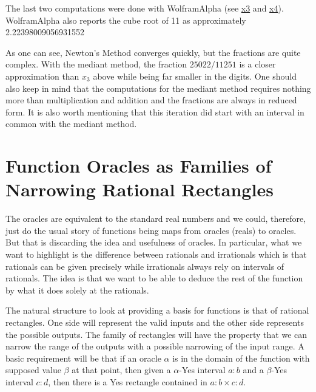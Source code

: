 \documentclass[12pt]{article}
\theoremstyle{remark}
\begin{document}
The last two computations  were done with WolframAlpha (see 
\href{https://www.wolframalpha.com/input?key=&i2d=true&i=%5C%2840%29Divide%5B2162%2C972%5D%5C%2841%29+-+Divide%5B%5C%2840%29+Power%5B%5C%2840%29Divide%5B2162%2C972%5D%5C%2841%29%2C3%5D-+11%5C%2841%29%2C3*Power%5B%5C%2840%29Divide%5B2162%2C972%5D%5C%2841%29%2C2%5D%5D}{x3} and 
\href{https://www.wolframalpha.com/input?key=&i2d=true&i=%5C%2840%29Divide%5B1894566349%2C851880969%5D%5C%2841%29+-++Divide%5B%5C%2840%29+Power%5B%5C%2840%29Divide%5B1894566349%2C851880969%5D%5C%2841%29%2C3%5D-11%5C%2841%29%2C%5C%2840%293+Power%5B%5C%2840%29Divide%5B1894566349%2C851880969%5D%5C%2841%29%2C2%5D%5C%2841%29%5D}{x4}).  WolframAlpha also reports the cube root of 11 as approximately 2.22398009056931552 

As one can see, Newton's Method converges quickly, but the fractions are quite complex. With the mediant method, the fraction $25022/11251$ is a closer approximation than $x_3$ above while being far smaller in the digits. One should also keep in mind that the computations for the mediant method requires nothing more than multiplication and addition and the fractions are always in reduced form. It is also worth mentioning that this iteration did start with an interval in common with the mediant method. 


\section{Function Oracles as Families of Narrowing Rational Rectangles}

The oracles are equivalent to the standard real numbers and we could, therefore, just do the usual story of functions being maps from oracles (reals) to oracles. But that is discarding the idea and usefulness of oracles. In particular, what we want to highlight is the difference between rationals and irrationals which is that rationals can be given precisely while irrationals always rely on intervals of rationals. The idea is that we want to be able to deduce the rest of the function by what it does solely at the rationals. 

The natural structure to look at providing a basis for functions is that of rational rectangles. One side will represent the valid inputs and the other side represents the possible outputs. The family of rectangles will have the property that we can narrow the range of the outputs with a possible narrowing of the input range. A basic requirement will be that if an oracle $\alpha$ is in the domain of the function with supposed value $\beta$ at that point, then given a $\alpha$-Yes interval $a:b$ and a $\beta$-Yes interval $c:d$, then there is a Yes rectangle contained in $a:b \times c:d$. 
\end{document}
